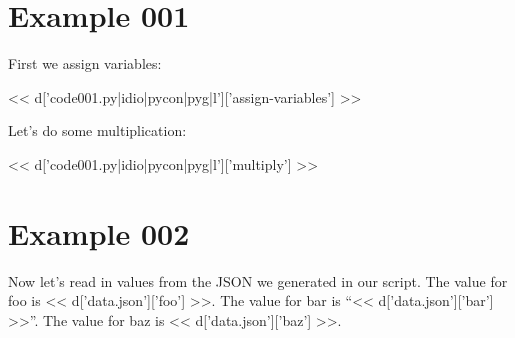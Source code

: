 \section{Example 001}

First we assign variables:

<< d['code001.py|idio|pycon|pyg|l']['assign-variables'] >>

Let's do some multiplication:

<< d['code001.py|idio|pycon|pyg|l']['multiply'] >>

\section{Example 002}

Now let's read in values from the JSON we generated in our script. The value for foo is << d['data.json']['foo'] >>. The value for bar is ``<< d['data.json']['bar'] >>''. The value for baz is << d['data.json']['baz'] >>.
